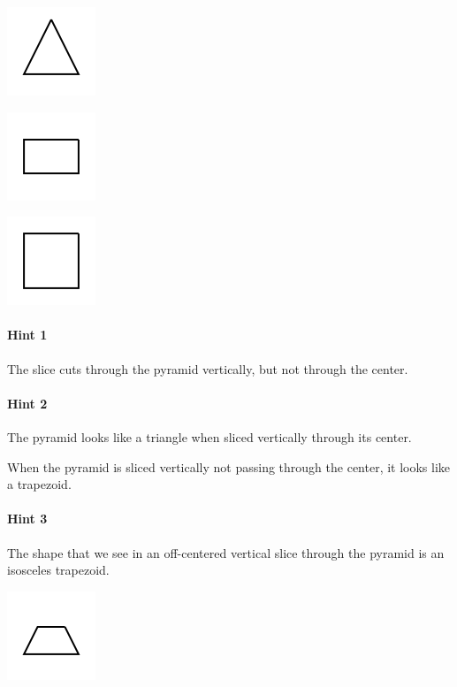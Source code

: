\documentclass[twocolumn,10pt]{article}
\def\shrinkfactor{0.4}
\begin{document}
 
\includegraphics[scale=\shrinkfactor]{figures/d443e0deb4dc18ef30fbf9139d310266f460b66b.png}


\includegraphics[scale=\shrinkfactor]{figures/0e5042b475e0847d67b74c0482f8e8173f798656.png}


\includegraphics[scale=\shrinkfactor]{figures/4b59a0ece6acc7c19c389e1de534d1df93bf1169.png}



\paragraph{Hint 1}The slice cuts through the pyramid vertically, but not through the center.

\paragraph{Hint 2}The pyramid looks like a triangle when sliced vertically through its center.

When the pyramid is sliced vertically not passing through the center, it looks like a trapezoid.

\paragraph{Hint 3}The shape that we see in an off-centered vertical slice through the pyramid is an isosceles trapezoid.  

\includegraphics[scale=\shrinkfactor]{figures/462dbf19e63d9954ed7a531f7ea0e2b0379d9bb9.png}
\end{document}
